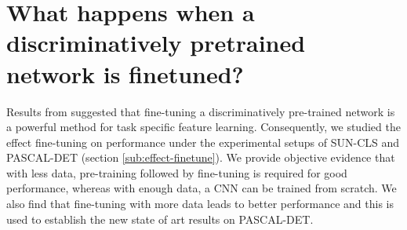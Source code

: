 
\section{What happens when a discriminatively pretrained network is finetuned?}
\label{sec:fine}


Results from \cite{Rcnn} suggested that fine-tuning a discriminatively pre-trained network is a powerful method for task specific feature learning. Consequently, we studied the effect fine-tuning on performance under the experimental setups of SUN-CLS and PASCAL-DET (section \ref{sub:effect-finetune}). We provide objective evidence that with less data, pre-training followed by fine-tuning is required for good performance, whereas with enough data, a CNN can be trained from scratch. We also find that fine-tuning with more data leads to better performance and this is used to establish the new state of art results on PASCAL-DET.

